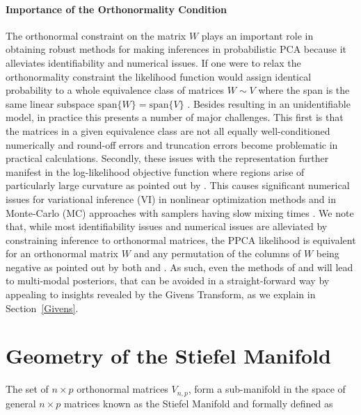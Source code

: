 \documentclass{article}
\begin{document}
\paragraph{Importance of the Orthonormality Condition}
The orthonormal constraint on the matrix $W$ plays an important role in obtaining robust methods for making inferences in probabilistic PCA because it alleviates identifiability and numerical issues.  If one were to relax the orthonormality constraint the likelihood function would assign identical probability to a whole equivalence class of matrices $W \sim V$ where the span is the same linear subspace $\mbox{span}\{W\} = \mbox{span}\{V\}$ \citet[chapt.~12.1.3]{murphy2012machine}.  Besides resulting in an unidentifiable model, in practice this presents a number of major challenges.  This first is that the matrices in a given equivalence class are not all equally well-conditioned numerically and round-off errors and truncation errors become problematic in practical calculations.  Secondly, these issues with the representation further manifest in the log-likelihood objective function where regions arise of particularly large curvature as pointed out by \citep{holbrook2016bayesian}.  This causes significant numerical issues for variational inference (VI) in nonlinear optimization methods and in Monte-Carlo (MC) approaches with samplers having slow mixing times \citep{holbrook2016bayesian}. We note that, while most identifiability issues and numerical issues are alleviated by constraining inference to orthonormal matrices, the PPCA likelihood is equivalent for an orthonormal matrix $W$ and any permutation of the columns of $W$ being negative as pointed out by both \citet[chapt.~12.1.3]{murphy2012machine} and  \citet{holbrook2016bayesian}. As such, even the methods of \citet{brubaker2012family} and \citet{byrne2013geodesic} will lead to multi-modal posteriors, that can be avoided in a straight-forward way by appealing to insights revealed by the Givens Transform, as we explain in Section~\ref{Givens}.


\section{Geometry of the Stiefel Manifold} \label{geometry}

The set of $n\times p$ orthonormal matrices $V_{n,p}$, form a sub-manifold in the space of general $n \times p$ matrices known as the Stiefel Manifold \citep{muirhead2009aspects} and formally defined as
\end{document}
